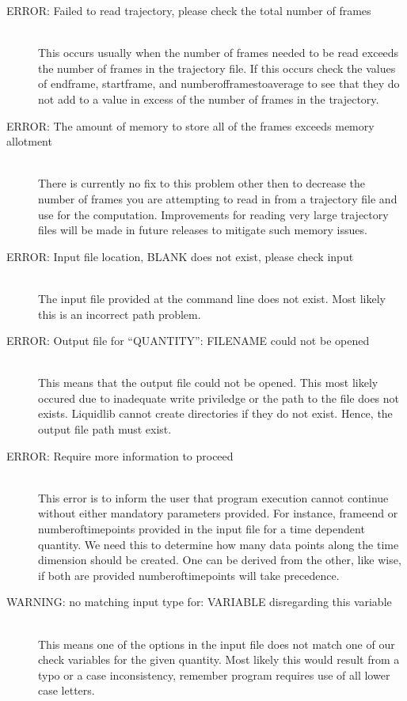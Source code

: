 \documentclass{article}
\begin{document}
\begin{description}
	\item[ERROR: Failed to read trajectory, please check the total number of frames] \hfill \\
	This occurs usually when the number of frames needed to be read exceeds the number of frames in the trajectory file.  If this occurs check the values of endframe, startframe, and numberofframestoaverage to see that they do not add to a value in excess of the number of frames in the trajectory.
	
	\item[ERROR: The amount of memory to store all of the frames exceeds memory allotment] \hfill \\
	There is currently no fix to this problem other then to decrease the number of frames you are attempting to read in from a trajectory file and use for the computation.  Improvements for reading very large trajectory files will be made in future releases to mitigate such memory issues.
	
	\item[ERROR: Input file location, BLANK does not exist, please check input] \hfill \\
	The input file provided at the command line does not exist.  Most likely this is an incorrect path problem.
	
	\item[ERROR: Output file for ``QUANTITY'': FILENAME could not be opened] \hfill \\
	This means that the output file could not be opened.  This most likely occured due to inadequate write priviledge or the path to the file does not exists.  Liquidlib cannot create directories if they do not exist. Hence, the output file path must exist. 
	
	\item[ERROR: Require more information to proceed] \hfill \\
	This error is to inform the user that program execution cannot continue without either mandatory parameters provided. For instance, frameend or numberoftimepoints provided in the input file for a time dependent quantity.  We need this to determine how many data points along the time dimension should be created.  One can be derived from the other, like wise, if both are provided numberoftimepoints will take precedence. 
	
	
	
	
	\item[WARNING: no matching input type for: VARIABLE disregarding this variable] \hfill \\
	This means one of the options in the input file does not match one of our check variables for the given quantity.  Most likely this would result from a typo or a case inconsistency, remember program requires use of all lower case letters. 
	

\end{description}
\end{document}
